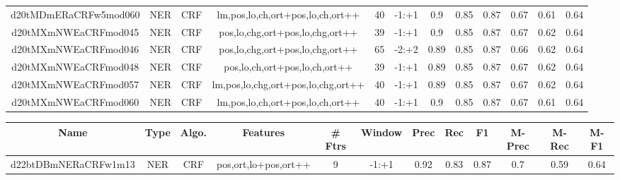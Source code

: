 \documentclass[a4paper]{article}
\begin{document}
\begin{landscape}
\begin{center}
\begin{tabular}{ |c|c|c|c|c|c|c|c|c|c|c|c|}
 	
 
 	
 		
 		\small{ d20tMDmERaCRFw5mod060 } & NER & CRF & lm,pos,lo,ch,ort+pos,lo,ch,ort++  &  40 &  -1:+1  &  0.9 & 0.85 & 0.87  &  0.67 & 0.61 & 0.64 \\
 		

 	
 
 	
 		
 		\small{ d20tMXmNWEaCRFmod045 } & NER & CRF & pos,lo,chg,ort+pos,lo,chg,ort++  &  39 &  -1:+1  &  0.9 & 0.85 & 0.87  &  0.67 & 0.62 & 0.64 \\
 		

 	
 
 	
 		
 		\small{ d20tMXmNWEaCRFmod046 } & NER & CRF & pos,lo,chg,ort+pos,lo,chg,ort++  &  65 &  -2:+2  &  0.89 & 0.85 & 0.87  &  0.66 & 0.62 & 0.64 \\
 		

 	
 
 	
 		
 		\small{ d20tMXmNWEaCRFmod048 } & NER & CRF & pos,lo,ch,ort+pos,lo,ch,ort++  &  39 &  -1:+1  &  0.89 & 0.85 & 0.87  &  0.67 & 0.62 & 0.64 \\
 		

 	
 
 	
 		
 		\small{ d20tMXmNWEaCRFmod057 } & NER & CRF & lm,pos,lo,chg,ort+pos,lo,chg,ort++  &  40 &  -1:+1  &  0.89 & 0.85 & 0.87  &  0.67 & 0.62 & 0.64 \\
 		

 	
 
 	
 		
 		\small{ d20tMXmNWEaCRFmod060 } & NER & CRF & lm,pos,lo,ch,ort+pos,lo,ch,ort++  &  40 &  -1:+1  &  0.9 & 0.85 & 0.87  &  0.67 & 0.61 & 0.64 \\
 		
 \hline
\end{tabular}
\end{center}




\begin{center}
\begin{tabular}{ |c|c|c|c|c|c|c|c|c|c|c|c|} 
 \hline
 	Name & Type & Algo. & Features & \# Ftrs & Window & Prec & Rec & F1 & M-Prec & M-Rec & M-F1\\
 \hline

 		

 	
 
 	
 		
 		\small{ d22btDBmNERaCRFw1m13 } & NER & CRF & pos,ort,lo+pos,ort++  &  9 &  -1:+1  &  0.92 & 0.83 & 0.87  &  0.7 & 0.59 & 0.64 \\
 		


\end{tabular}
\end{center}
\end{landscape}
\end{document}
